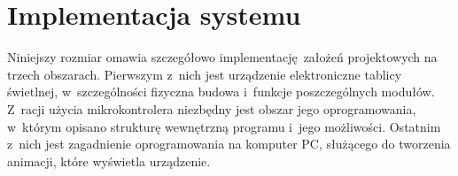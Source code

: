 \chapter{Implementacja systemu}

Niniejszy rozmiar omawia szczegółowo implementację założeń projektowych na trzech obszarach. Pierwszym z~nich jest urządzenie elektroniczne tablicy świetlnej, w~szczególności fizyczna budowa i~funkcje poszczególnych modułów. Z~racji użycia mikrokontrolera niezbędny jest obszar jego oprogramowania, w~którym opisano strukturę wewnętrzną programu i~jego możliwości. Ostatnim z~nich jest zagadnienie oprogramowania na komputer PC, służącego do tworzenia animacji, które wyświetla urządzenie.




